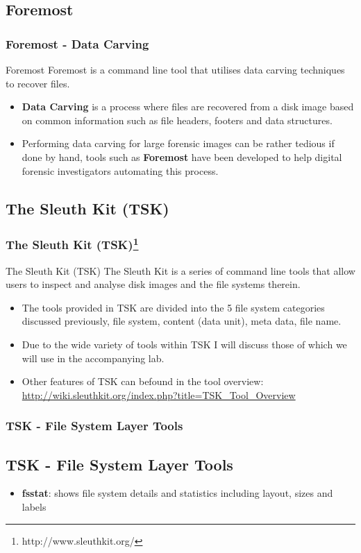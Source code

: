 \documentclass{beamer}
\begin{document}
\begin{frame}
	\subsection*{Foremost}
	\frametitle{Foremost - Data Carving}
	\begin{block}{Foremost}
		Foremost is a command line tool that utilises data carving techniques to recover files.
	\end{block}
	\begin{itemize}
		\item \textbf{Data Carving} is a process where files are recovered from a disk image based on common information such as file headers, footers and data structures. 
		\item Performing data carving for large forensic images can be rather tedious if done by hand, tools such as \textbf{Foremost} have been developed to help digital forensic investigators automating this process.
	\end{itemize}
\end{frame}

\begin{frame}
	\subsection*{The Sleuth Kit (TSK)}
	\frametitle{The Sleuth Kit (TSK)\footnote{http://www.sleuthkit.org/}}
	\begin{block}{The Sleuth Kit (TSK)}
	The Sleuth Kit is a series of command line tools that allow users to inspect and analyse disk images and the file systems therein.
	\end{block}
	\begin{itemize}
		\item The tools provided in TSK are divided into the 5 file system categories discussed previously, file system, content (data unit), meta data, file name.
		\item Due to the wide variety of tools within TSK I will discuss those of which we will use in the accompanying lab.
		\item Other features of TSK can befound in the tool overview: \url{http://wiki.sleuthkit.org/index.php?title=TSK_Tool_Overview}
	\end{itemize}
\end{frame}

\begin{frame}
	\frametitle{TSK - File System Layer Tools}
	\subsection*{TSK - File System Layer Tools}
	\begin{itemize}
		\item \textbf{fsstat}: shows file system details and statistics including layout, sizes and labels
	\end{itemize}	
\end{frame}
\end{document}
